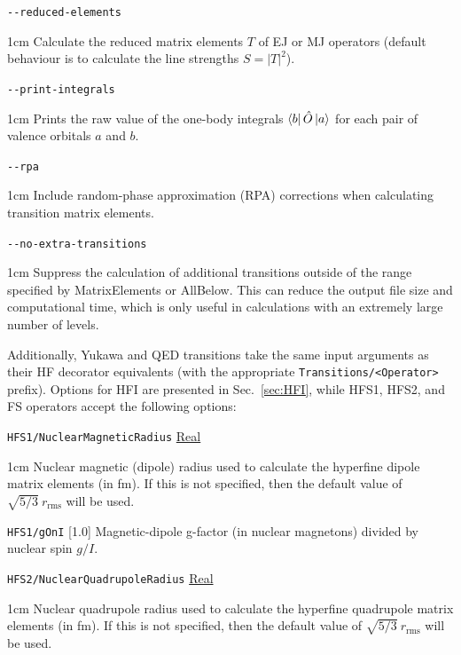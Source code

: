 \documentclass{report}
\begin{document}
\texttt{{-}{-}reduced-elements} 
\begin{adjustwidth}{1cm}{}
Calculate the reduced matrix elements $T$ of EJ or MJ operators (default behaviour is to calculate the line strengths 
$S = |T|^2$).
\end{adjustwidth}

\texttt{{-}{-}print-integrals} 
\begin{adjustwidth}{1cm}{}
Prints the raw value of the one-body integrals $\bra{b}\hat{O}\ket{a}$ for each pair of valence 
orbitals $a$ and $b$.
\end{adjustwidth}

\texttt{{-}{-}rpa}
\begin{adjustwidth}{1cm}{}
Include random-phase approximation (RPA) corrections when calculating transition matrix elements. 
\end{adjustwidth}


\texttt{{-}{-}no-extra-transitions} \label{keyword:--no-extra-transitions}
\begin{adjustwidth}{1cm}{}
Suppress the calculation of additional transitions outside of the range specified by MatrixElements or AllBelow. This can reduce the output file size and computational time, which is only useful in calculations with an extremely large number of levels.
\end{adjustwidth}

Additionally, Yukawa and QED transitions take the same input arguments as their HF decorator equivalents (with the appropriate \hbox{\texttt{Transitions/\textless{Operator}\textgreater}} prefix). Options for HFI are presented in Sec.~\ref{sec:HFI}, while HFS1, HFS2, and FS operators accept the following options:

\texttt{HFS1/NuclearMagneticRadius} \uline{Real}
\begin{adjustwidth}{1cm}{}
Nuclear magnetic (dipole) radius used to calculate the hyperfine dipole matrix elements (in fm). If this is not
specified, then the default value of $\sqrt{5/3} ~ r_{\textrm{rms}}$ will be used.
\end{adjustwidth}

\texttt{HFS1/gOnI} [1.0]
Magnetic-dipole g-factor (in nuclear magnetons) divided by nuclear spin $g/I$.

\texttt{HFS2/NuclearQuadrupoleRadius} \uline{Real}
\begin{adjustwidth}{1cm}{}
Nuclear quadrupole radius used to calculate the hyperfine quadrupole matrix elements (in fm). If this is not
specified, then the default value of $\sqrt{5/3} ~ r_{\textrm{rms}}$ will be used.
\end{adjustwidth}
\end{document}
